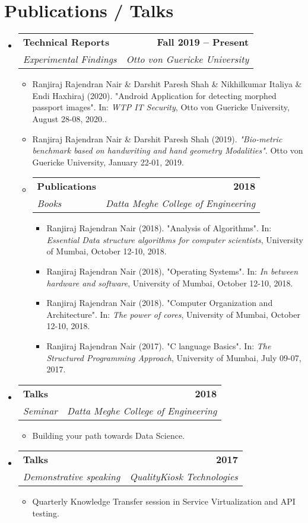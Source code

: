 \documentclass[letterpaper,11pt]{article}
\makeatletter
\newcommand{\resumeItem}[1]{
  \item\small{
    {#1 \vspace{-2pt}}
  }
}
\newcommand{\resumeSubheading}[4]{
  \vspace{-2pt}\item
    \begin{tabular*}{1.0\textwidth}[t]{l@{\extracolsep{\fill}}r}
      \textbf{#1} & \textbf{\small #2} \\
      \textit{\small#3} & \textit{\small #4} \\
    \end{tabular*}\vspace{-7pt}
}
\newcommand{\resumeSubHeadingListStart}{\begin{itemize}[leftmargin=0.0in, label={}]}
\newcommand{\resumeSubHeadingListEnd}{\end{itemize}}
\newcommand{\resumeItemListStart}{\begin{itemize}}
\newcommand{\resumeItemListEnd}{\end{itemize}\vspace{-5pt}}
\makeatother
\begin{document}
\section{Publications / Talks}
    \resumeSubHeadingListStart
        \resumeSubheading{Technical Reports}{Fall 2019 -- Present}{Experimental Findings}{Otto von Guericke University}
            \resumeItemListStart
                \resumeItem{Ranjiraj Rajendran Nair \& Darshit Paresh Shah \&  Nikhilkumar Italiya \& Endi Haxhiraj (2020). "Android Application for detecting morphed passport images". In: \textit{WTP IT Security}, Otto von Guericke University, August 28-08, 2020..}
                \resumeItem{Ranjiraj Rajendran Nair \& Darshit Paresh Shah (2019). \textit{"Bio-metric benchmark based on handwriting and hand geometry Modalities"}. Otto von Guericke University, January 22-01, 2019.}
            \resumeItemListEnd
    
    \resumeSubHeadingListStart
        \resumeSubheading{Publications}{2018}{Books}{Datta Meghe College of Engineering}
            \resumeItemListStart
                \resumeItem{Ranjiraj Rajendran Nair (2018). "Analysis of Algorithms". In: \textit{Essential Data structure algorithms for computer scientists}, University of Mumbai, October 12-10, 2018.}
                \resumeItem{Ranjiraj Rajendran Nair (2018), "Operating Systems". In: \textit{In between hardware and software}, University of Mumbai, October 12-10, 2018.}
                \resumeItem{Ranjiraj Rajendran Nair (2018). "Computer Organization and Architecture". In: \textit{The power of cores}, University of Mumbai, October 12-10, 2018.}
                \resumeItem{Ranjiraj Rajendran Nair (2017). "C language Basics". In: \textit{The Structured Programming Approach}, University of Mumbai, July 09-07, 2017.}
                
            \resumeItemListEnd
        
    \resumeSubHeadingListEnd
    
    \resumeSubHeadingListEnd
    
    \resumeSubHeadingListStart
        \resumeSubheading{Talks}{2018}{Seminar}{Datta Meghe College of Engineering}
            \resumeItemListStart
                \resumeItem{Building your path towards Data Science.}
            \resumeItemListEnd
        
    \resumeSubHeadingListEnd
    
    \resumeSubHeadingListStart
        \resumeSubheading{Talks}{2017}{Demonstrative speaking}{QualityKiosk Technologies}
            \resumeItemListStart
                \resumeItem{Quarterly Knowledge Transfer session in Service Virtualization and API testing.}
            \resumeItemListEnd
        
    \resumeSubHeadingListEnd
\end{document}
